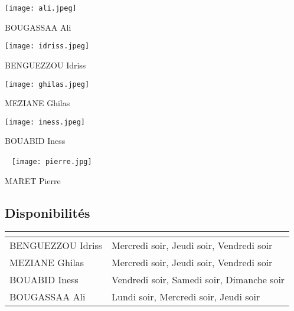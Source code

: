 \documentclass[a4paper, 12pt]{article}
\begin{document}
\begin{center}
\begin{minipage}{0.25\textwidth}
\centering
\texttt{[image: ali.jpeg]}
\caption{BOUGASSAA Ali}
\end{minipage}%
\begin{minipage}{0.25\textwidth}
\centering
\texttt{[image: idriss.jpeg]}
\caption{BENGUEZZOU Idriss}
\end{minipage}%
\begin{minipage}{0.25\textwidth}
\centering
\texttt{[image: ghilas.jpeg]}
\caption{MEZIANE Ghilas}
\end{minipage}%
\begin{minipage}{0.25\textwidth}
\centering
\texttt{[image: iness.jpeg]}
\caption{BOUABID Iness}
\end{minipage}

\begin{minipage}{0.25\textwidth}\
\centering
\texttt{[image: pierre.jpg]}
\caption{MARET Pierre}
\end{minipage}
\label{fig:team-presentation}
\end{center}


\subsection{Disponibilités}
\begin{center}
\begin{tabular}{|p{5cm}|p{5cm}|}
\hline
\rowcolor[HTML]{FFFFFF}
\textbf{\color{black}{\makecell{Membre}}} & \textbf{\color{black}{\makecell{Disponibilités}}} \\
\hline
\rowcolor[HTML]{EFEFEF}
BENGUEZZOU Idriss & Mercredi soir, Jeudi soir, Vendredi soir \\
\hline
\rowcolor[HTML]{EFEFEF}
MEZIANE Ghilas & Mercredi soir, Jeudi soir, Vendredi soir \\
\hline
\rowcolor[HTML]{EFEFEF}
BOUABID Iness & Vendredi soir, Samedi soir, Dimanche soir \\
\hline
\rowcolor[HTML]{EFEFEF}
BOUGASSAA Ali & Lundi soir, Mercredi soir, Jeudi soir \\
\hline
\end{tabular}
\end{center}
\end{document}
